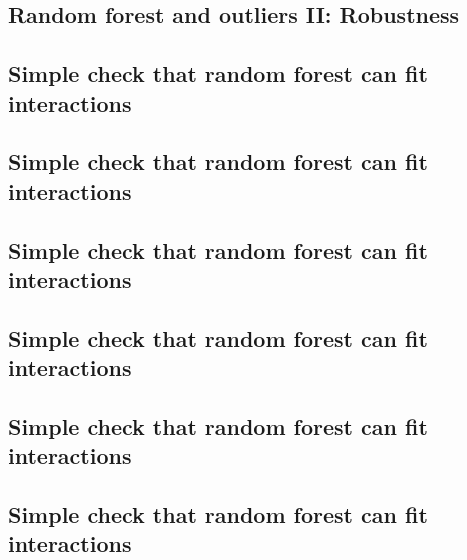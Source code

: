 \subsection{Random forest and outliers II: Robustness}


\subsection{Simple check that random forest can fit interactions}


\subsection{Simple check that random forest can fit interactions}


\subsection{Simple check that random forest can fit interactions}


\subsection{Simple check that random forest can fit interactions}


\subsection{Simple check that random forest can fit interactions}


\subsection{Simple check that random forest can fit interactions}



